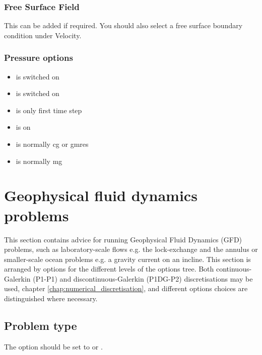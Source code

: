 \subsubsection{Free Surface Field}
This can be added if required.  You should also select a free surface boundary condition under Velocity.

\subsubsection{Pressure options}
\begin{itemize}
\item {} is switched on
\item {} is switched on
\item {} is only first time step
\item {} is  on
\item {} is normally cg or gmres
\item {} is normally mg
\end{itemize}


\section{Geophysical fluid dynamics problems}

This section contains advice for running Geophysical Fluid Dynamics (GFD) problems, such as laboratory-scale flows e.g. the lock-exchange and the annulus or smaller-scale ocean problems e.g. a gravity current on an incline. This section is arranged by options for the different levels of the options tree. Both continuous-Galerkin (P1-P1) and discontinuous-Galerkin (P1DG-P2) discretisations may be used, chapter \ref{chap:numerical_discretisation}, and different options choices are distinguished where necessary.

\subsection{Problem type}

The  option should be set to  or .

